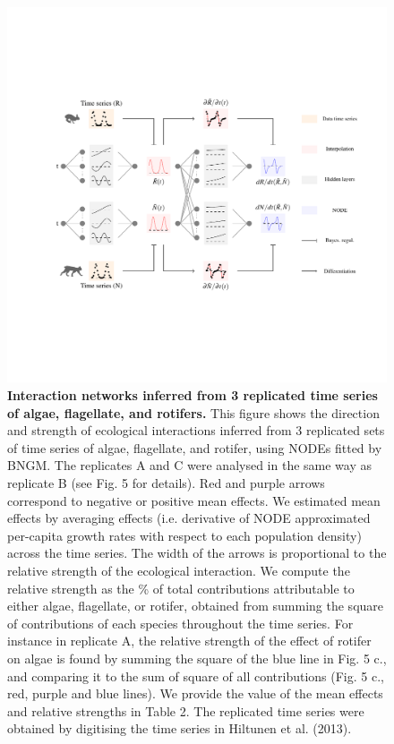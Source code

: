 \documentclass[11pt, oneside]{article}
\begin{document}
\newpage
\begin{figure}[H]
\includegraphics[width=1\linewidth,page=6]{figures/main.pdf}
\caption{
    \textbf{Interaction networks inferred from 3 replicated time series of algae, flagellate, and rotifers.}
    This figure shows the direction and strength of ecological interactions inferred from 3 replicated sets of time series of algae, flagellate, and rotifer, using NODEs fitted by BNGM.
    The replicates A and C were analysed in the same way as replicate B (see Fig. 5 for details).
    Red and purple arrows correspond to negative or positive mean effects. 
    We estimated mean effects by averaging effects (i.e. derivative of NODE approximated per-capita growth rates with respect to each population density) across the time series.
    The width of the arrows is proportional to the relative strength of the ecological interaction. 
    We compute the relative strength as the \% of total contributions attributable to either algae, flagellate, or rotifer, obtained from summing the square of contributions of each species throughout the time series.
    For instance in replicate A, the relative strength of the effect of rotifer on algae is found by summing the square of the blue line in Fig. 5 c., and comparing it to the sum of square of all contributions (Fig. 5 c., red, purple and blue lines).
    We provide the value of the mean effects and relative strengths in Table 2.
    The replicated time series were obtained by digitising the time series in Hiltunen et al. (2013).
}
\end{figure}
\newpage
\end{document}
